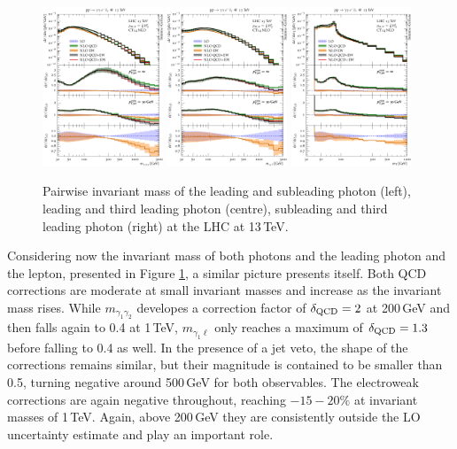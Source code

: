 \begin{figure}[t!]
  \centering
  \includegraphics[width=0.32\textwidth]{figs_aaw/m_y1y2_comb_log}
  \includegraphics[width=0.32\textwidth]{figs_aaw/m_y1l1_comb_log}
  \includegraphics[width=0.32\textwidth]{figs_aaw/m_t_comb_log}
  \caption{
    Pairwise invariant mass of the leading and subleading photon (left),
    leading and third leading photon (centre), subleading and third leading 
    photon (right) at the LHC at 13\,TeV.
    \label{fig:aaw:myy}
  }
\end{figure}

Considering now the invariant mass of both photons 
and the leading photon and the lepton, presented in 
Figure \ref{fig:aaw:myy}, a similar picture 
presents itself. 
Both QCD corrections are moderate at small invariant 
masses and increase as the invariant mass rises. 
While $m_{\gamma_1\gamma_2}$ developes a correction 
factor of $\delta_\text{QCD}=2$ at 200\,GeV and then falls 
again to 0.4 at 1\,TeV, $m_{\gamma_1\ell}$ only 
reaches a maximum of $\delta_\text{QCD}=1.3$ before falling 
to 0.4 as well. 
In the presence of a jet veto, the shape of the corrections 
remains similar, but their magnitude is contained to 
be smaller than 0.5, turning negative around 500\,GeV 
for both observables. 
The electroweak corrections are again negative 
throughout, reaching $-15-20\%$ at invariant masses 
of 1\,TeV.
Again, above 200\,GeV they are consistently outside 
the LO uncertainty estimate and play an important 
role.

